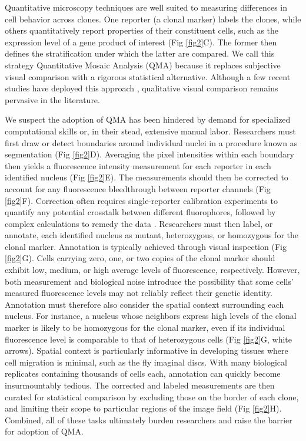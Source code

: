 \documentclass[10pt,letterpaper]{article}
\begin{document}
Quantitative microscopy techniques are well suited to measuring differences in cell behavior across clones. One reporter (a clonal marker) labels the clones, while others quantitatively report properties of their constituent cells, such as the expression level of a gene product of interest (Fig \ref{fig2}C). The former then defines the stratification under which the latter are compared. We call this strategy Quantitative Mosaic Analysis (QMA) because it replaces subjective visual comparison with a rigorous statistical alternative. Although a few recent studies have deployed this approach \cite{Dai2017,Bernasek2018,Ghiglione2018,Li2018}, qualitative visual comparison remains pervasive in the literature.

We suspect the adoption of QMA has been hindered by demand for specialized computational skills or, in their stead, extensive manual labor. Researchers must first draw or detect boundaries around individual nuclei in a procedure known as segmentation (Fig \ref{fig2}D). Averaging the pixel intensities within each boundary then yields a fluorescence intensity measurement for each reporter in each identified nucleus (Fig \ref{fig2}E). The measurements should then be corrected to account for any fluorescence bleedthrough between reporter channels (Fig \ref{fig2}F). Correction often requires single-reporter calibration experiments to quantify any potential crosstalk between different fluorophores, followed by complex calculations to remedy the data \cite{Bacia2012,Elangovan2003}. Researchers must then label, or annotate, each identified nucleus as mutant, heterozygous, or homozygous for the clonal marker. Annotation is typically achieved through visual inspection (Fig \ref{fig2}G). Cells carrying zero, one, or two copies of the clonal marker should exhibit low, medium, or high average levels of fluorescence, respectively. However, both measurement and biological noise introduce the possibility that some cells’ measured fluorescence levels may not reliably reflect their genetic identity. Annotation must therefore also consider the spatial context surrounding each nucleus. For instance, a nucleus whose neighbors express high levels of the clonal marker is likely to be homozygous for the clonal marker, even if its individual fluorescence level is comparable to that of heterozygous cells (Fig \ref{fig2}G, white arrows). Spatial context is particularly informative in developing tissues where cell migration is minimal, such as the fly imaginal discs. With many biological replicates containing thousands of cells each, annotation can quickly become insurmountably tedious. The corrected and labeled measurements are then curated for statistical comparison by excluding those on the border of each clone, and limiting their scope to particular regions of the image field (Fig \ref{fig2}H). Combined, all of these tasks ultimately burden researchers and raise the barrier for adoption of QMA. 
\end{document}

